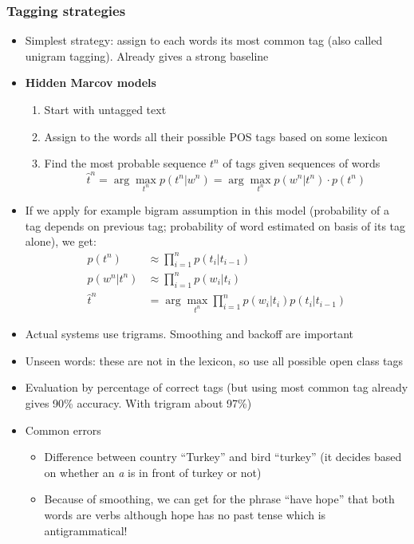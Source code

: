 \subsubsection{Tagging strategies}
\begin{itemize}
	\item Simplest strategy: assign to each words its most common tag (also called unigram tagging). Already gives a strong baseline
	\item \textbf{Hidden Marcov models}
	\begin{enumerate}
		\item Start with untagged text
		\item Assign to the words all their possible POS tags based on some lexicon
		\item Find the most probable sequence $t^{n}$ of tags given sequences of words
		$$\hat{t}^{n} = \arg\max_{t^{n}} p(t^{n} | w^{n}) = \arg\max_{t^{n}} p(w^{n}|t^{n})\cdot p(t^{n}) $$
	\end{enumerate}
	\item If we apply for example bigram assumption in this model (probability of a tag depends on previous tag; probability of word estimated on basis of its tag alone), we get:
	\begin{equation*}
	\begin{split}
	p(t^{n}) & \approx \prod_{i=1}^{n} p(t_i | t_{i-1})\\
	p(w^{n}|t^{n}) & \approx \prod_{i=1}^{n} p(w_i | t_i)\\
	\hat{t}^{n} & = \arg\max_{t^{n}} \prod_{i=1}^{n}p(w_i | t_i)p(t_i | t_{i-1})
	\end{split}
	\end{equation*}
	\item Actual systems use trigrams. Smoothing and backoff are important
	\item Unseen words: these are not in the lexicon, so use all possible open class tags
	\item Evaluation by percentage of correct tags (but using most common tag already gives 90\% accuracy. With trigram about 97\%)
	\item Common errors
	\begin{itemize}
		\item Difference between country ``Turkey'' and bird ``turkey'' (it decides based on whether an \textit{a} is in front of turkey or not)
		\item Because of smoothing, we can get for the phrase ``have hope'' that both words are verbs although hope has no past tense which is antigrammatical!
	\end{itemize}
\end{itemize}